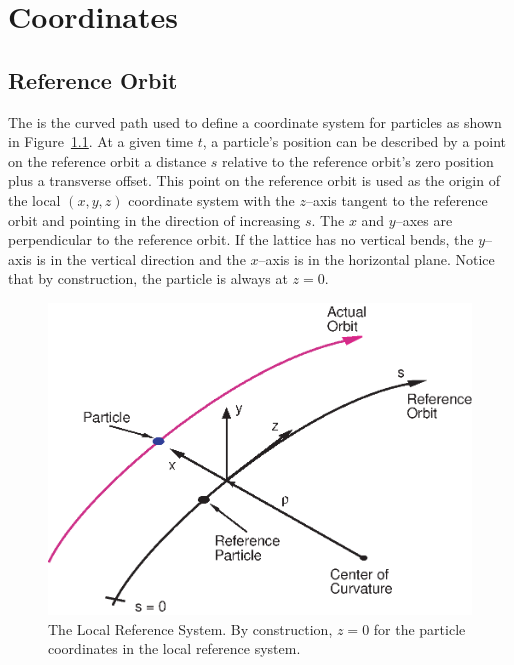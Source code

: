 \chapter{Coordinates}

\section{Reference Orbit}
\label{s:ref}

The  is the curved path used to define a coordinate
system for particles as shown in Figure~\ref{f:local_coords}.  At a
given time $t$, a particle's position can be described by a point on
the reference orbit a distance $s$ relative to the reference orbit's
zero position plus a transverse offset. This point on the reference
orbit is used as the origin of the local $(x, y, z)$ coordinate system
with the $z$--axis tangent to the reference orbit and pointing in the
direction of increasing $s$. The $x$ and $y$--axes are
perpendicular to the reference orbit. If the lattice has no vertical
bends, the $y$--axis is in the vertical direction and the $x$--axis is
in the horizontal plane. Notice that by construction, the particle is
always at $z = 0$.

\begin{figure}[tb]
\centering
\includegraphics{local_coords.eps}
\caption[The Local Reference System.]
{The Local Reference System. By construction, $z = 0$ for
the particle coordinates in the local reference system.}
\label{f:local_coords}
\end{figure}

